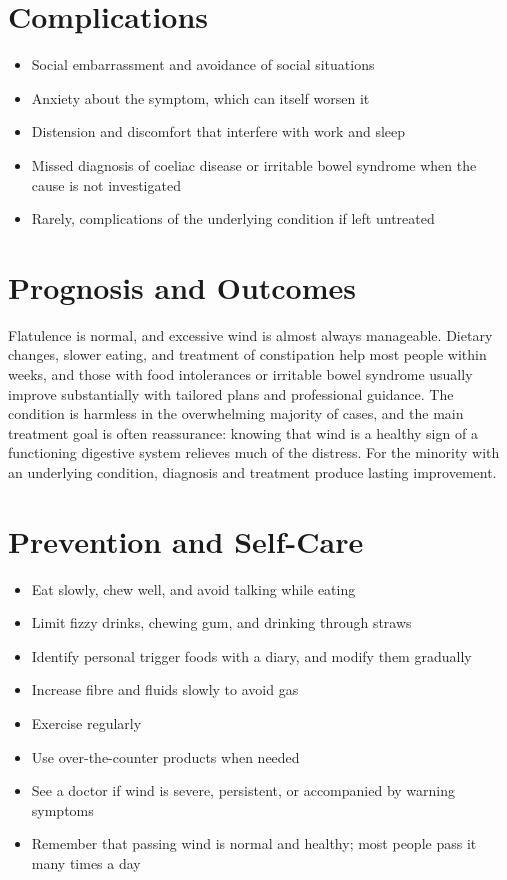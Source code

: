 \section*{Complications}
\begin{itemize}
    \item Social embarrassment and avoidance of social situations
    \item Anxiety about the symptom, which can itself worsen it
    \item Distension and discomfort that interfere with work and sleep
    \item Missed diagnosis of coeliac disease or irritable bowel syndrome when the cause is not investigated
    \item Rarely, complications of the underlying condition if left untreated
\end{itemize}

\section*{Prognosis and Outcomes}
Flatulence is normal, and excessive wind is almost always manageable. Dietary changes, slower eating, and treatment of constipation help most people within weeks, and those with food intolerances or irritable bowel syndrome usually improve substantially with tailored plans and professional guidance. The condition is harmless in the overwhelming majority of cases, and the main treatment goal is often reassurance: knowing that wind is a healthy sign of a functioning digestive system relieves much of the distress. For the minority with an underlying condition, diagnosis and treatment produce lasting improvement.

\section*{Prevention and Self-Care}
\begin{itemize}
    \item Eat slowly, chew well, and avoid talking while eating
    \item Limit fizzy drinks, chewing gum, and drinking through straws
    \item Identify personal trigger foods with a diary, and modify them gradually
    \item Increase fibre and fluids slowly to avoid gas
    \item Exercise regularly
    \item Use over-the-counter products when needed
    \item See a doctor if wind is severe, persistent, or accompanied by warning symptoms
    \item Remember that passing wind is normal and healthy; most people pass it many times a day
\end{itemize}

